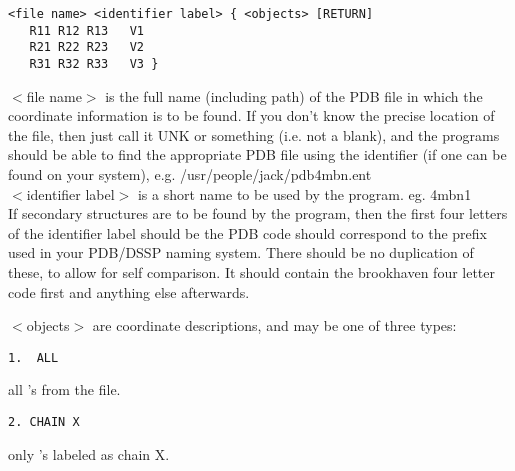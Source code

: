 \begin{scriptsize}\begin{verbatim}
<file name> <identifier label> { <objects> [RETURN]
   R11 R12 R13   V1
   R21 R22 R23   V2
   R31 R32 R33   V3 }
\end{verbatim} \end{scriptsize}

$<$file name$>$ is the full name (including path) of the PDB file in
which the coordinate information is to be found.  If you don't know the 
precise location of the file, then just call it UNK or something (i.e. 
not a blank), and the programs should be able to find the appropriate PDB 
file using the identifier (if one can be found on your system), e.g. 
/usr/people/jack/pdb4mbn.ent\\

$<$identifier label$>$ is a short name to be used by the program. 
eg. 4mbn1\\

If secondary structures are to be found by the program, then the
first  four letters of the identifier label should be the PDB code should
correspond to the prefix used in your PDB/DSSP naming system.
There should be no 
duplication of these, to allow for self comparison.  It should
contain  the brookhaven four letter code first and anything else 
afterwards.

$<$objects$>$ are coordinate descriptions, and may be one of three types:

\begin{scriptsize}\begin{verbatim}
1.  ALL  
\end{verbatim} \end{scriptsize}
all \Cal's from the file.\\

\begin{scriptsize}\begin{verbatim}
2. CHAIN X 
\end{verbatim} \end{scriptsize}
only \Cal's labeled as chain X.\\

